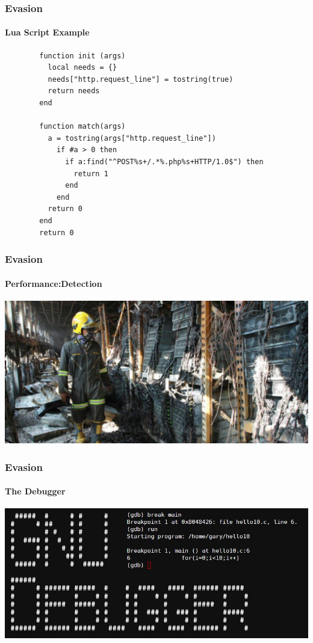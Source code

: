 \documentclass[aspectratio=169]{beamer}
\begin{document}
\begin{frame}[fragile]{}
  \frametitle{Evasion}
  \framesubtitle{Lua Script Example}
  \begin{center}
    \begin{tcolorbox}[title=alert.lua,colback=black]
    \begin{minipage}{0.5\textwidth}
      \begin{verbatim}
        function init (args)
          local needs = {}
          needs["http.request_line"] = tostring(true)
          return needs
        end

        function match(args)
          a = tostring(args["http.request_line"])
            if #a > 0 then
              if a:find("^POST%s+/.*%.php%s+HTTP/1.0$") then
                return 1
              end
            end
          return 0
        end
        return 0
      \end{verbatim}
    \end{minipage}
    \end{tcolorbox}
  \end{center}
\end{frame}

\begin{frame}
  \frametitle{Evasion}
  \framesubtitle{Performance:Detection}
  \begin{center}
    \includegraphics[width=14cm,keepaspectratio]{server_room_fire}
  \end{center}
\end{frame}

\begin{frame}
  \frametitle{Evasion}
  \framesubtitle{The Debugger}
  \begin{center}
    \includegraphics[width=14cm,keepaspectratio]{debugger}
  \end{center}
\end{frame}
\end{document}
